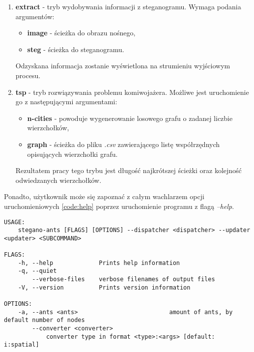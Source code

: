 {{{\begin{enumerate}
                \item \textbf{extract} - tryb wydobywania informacji z steganogramu. Wymaga podania argumentów:
                    \begin{itemize}
                        \item \textbf{image} - ścieżka do obrazu nośnego,
                        \item \textbf{steg} - ścieżka do steganogramu.
                    \end{itemize}

                    Odzyskana informacja zostanie wyświetlona na strumieniu wyjściowym procesu.

                \item \textbf{tsp} - tryb rozwiązywania problemu komiwojażera. Możliwe jest uruchomienie go z
                następującymi argumentami:
                    \begin{itemize}
                        \item \textbf{n-cities} - powoduje wygenerowanie losowego grafu o zadanej liczbie wierzchołków,
                        \item \textbf{graph} - ścieżka do pliku \textit{.csv} zawierającego listę współrzędnych
                        opisujących wierzchołki grafu.
                    \end{itemize}

                    Rezultatem pracy tego trybu jest długość najkrótszej ścieżki oraz kolejność odwiedzanych wierzchołków.
            \end{enumerate}


            Ponadto, użytkownik może się zapoznać z całym wachlarzem opcji uruchomieniowych \ref{code:help} poprzez uruchomienie programu z flagą
            \textit{--help}.

            \begin{lstlisting}[basicstyle=\tiny, caption=Pomoc programu, label=code:help]
USAGE:
    stegano-ants [FLAGS] [OPTIONS] --dispatcher <dispatcher> --updater <updater> <SUBCOMMAND>

FLAGS:
    -h, --help             Prints help information
    -q, --quiet
        --verbose-files    verbose filenames of output files
    -V, --version          Prints version information

OPTIONS:
    -a, --ants <ants>                          amount of ants, by default number of nodes
        --converter <converter>
            converter type in format <type>:<args> [default: i:spatial]


\end{lstlisting}}}}
